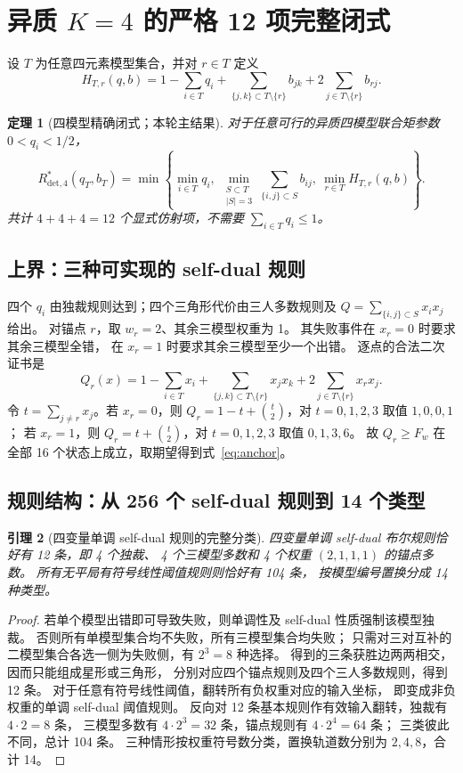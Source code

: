 \documentclass[11pt,a4paper]{ctexart}
\newtheorem{theorem}{定理}[section]
\newtheorem{lemma}[theorem]{引理}
\theoremstyle{remark}\newtheorem{remark}[theorem]{备注}
\newcommand{\Rstar}[1]{R^*_{\mathrm{det},#1}}
\begin{document}
\section{异质 $K=4$ 的严格 12 项完整闭式}
设 $T$ 为任意四元素模型集合，并对 $r\in T$ 定义
\begin{equation}\label{eq:anchor}
H_{T,r}(q,b)=
1-\sum_{i\in T}q_i
+\sum_{\{j,k\}\subset T\setminus\{r\}}b_{jk}
+2\sum_{j\in T\setminus\{r\}}b_{rj}.
\end{equation}
\begin{theorem}[四模型精确闭式；本轮主结果]\label{thm:k4}
对于任意可行的异质四模型联合矩参数 $0<q_i<1/2$，
\begin{equation}\label{eq:k4}
\boxed{
\Rstar{4}(q_T,b_T)=
\min\left\{
\min_{i\in T}q_i,\ 
\min_{\substack{S\subset T\\|S|=3}}\sum_{\{i,j\}\subset S}b_{ij},\ 
\min_{r\in T}H_{T,r}(q,b)
\right\}.}
\end{equation}
共计 $4+4+4=12$ 个显式仿射项，不需要 $\sum_{i\in T}q_i\le1$。
\end{theorem}

\subsection{上界：三种可实现的 self-dual 规则}
四个 $q_i$ 由独裁规则达到；四个三角形代价由三人多数规则及
$Q=\sum_{\{i,j\}\subset S}x_ix_j$ 给出。
对锚点 $r$，取 $w_r=2$、其余三模型权重为 1。
其失败事件在 $x_r=0$ 时要求其余三模型全错，
在 $x_r=1$ 时要求其余三模型至少一个出错。
逐点的合法二次证书是
\begin{equation}\label{eq:Qr}
Q_r(x)=1-\sum_{i\in T}x_i
+\sum_{\{j,k\}\subset T\setminus\{r\}}x_jx_k
+2\sum_{j\in T\setminus\{r\}}x_rx_j.
\end{equation}
令 $t=\sum_{j\ne r}x_j$。若 $x_r=0$，则
$Q_r=1-t+\binom t2$，对 $t=0,1,2,3$ 取值 $1,0,0,1$；
若 $x_r=1$，则 $Q_r=t+\binom t2$，对 $t=0,1,2,3$ 取值 $0,1,3,6$。
故 $Q_r\ge F_w$ 在全部 16 个状态上成立，取期望得到式~\eqref{eq:anchor}。

\subsection{规则结构：从 256 个 self-dual 规则到 14 个类型}
\begin{lemma}[四变量单调 self-dual 规则的完整分类]
四变量单调 self-dual 布尔规则恰好有 12 条，即 4 个独裁、
4 个三模型多数和 4 个权重 $(2,1,1,1)$ 的锚点多数。
所有无平局有符号线性阈值规则则恰好有 104 条，
按模型编号置换分成 14 种类型。
\end{lemma}
\begin{proof}
若单个模型出错即可导致失败，则单调性及 self-dual 性质强制该模型独裁。
否则所有单模型集合均不失败，所有三模型集合均失败；
只需对三对互补的二模型集合各选一侧为失败侧，有 $2^3=8$ 种选择。
得到的三条获胜边两两相交，因而只能组成星形或三角形，
分别对应四个锚点规则及四个三人多数规则，得到 12 条。
对于任意有符号线性阈值，翻转所有负权重对应的输入坐标，
即变成非负权重的单调 self-dual 阈值规则。
反向对 12 条基本规则作有效输入翻转，独裁有 $4\cdot2=8$ 条，
三模型多数有 $4\cdot2^3=32$ 条，锚点规则有 $4\cdot2^4=64$ 条；
三类彼此不同，总计 104 条。
三种情形按权重符号数分类，置换轨道数分别为 $2,4,8$，合计 14。
\end{proof}
\end{document}
